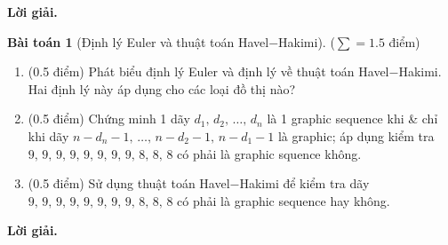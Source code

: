 \documentclass[a4paper, 11pt]{article}
\theoremstyle{definition}
\newtheorem{baitoan}{Bài toán}
\begin{document}
	\textbf{Lời giải. }

	\begin{tcolorbox}[breakable]
    	\begin{baitoan}[Định lý Euler và thuật toán Havel$-$Hakimi]
			($\sum = 1.5$ điểm)
			\begin{enumerate}[label=(\alph*)]
				\item (0.5 điểm) Phát biểu định lý Euler và định lý về thuật toán Havel$-$Hakimi. Hai định lý này áp dụng cho các loại đồ thị nào?
				\item (0.5 điểm) \cite[P10.1.13, p. 368]{shahriari2021invitation} Chứng minh 1 dãy $d_1,\,d_2,\,\ldots,\,d_n$ là 1 graphic sequence khi \& chỉ khi dãy $n - d_n - 1,\,\ldots,\,n - d_2 - 1,\,n - d_1 - 1$ là graphic; áp dụng kiểm tra $9,\,9,\,9,\,9,\,9,\,9,\,9,\,9,\,8,\,8,\,8$ có phải là graphic squence không. 	
				\item (0.5 điểm) Sử dụng thuật toán Havel$-$Hakimi để kiểm tra dãy $9,\,9,\,9,\,9,\,9,\,9,\,9,\,9,\,8,\,8,\,8$ có phải là graphic sequence hay không.
			\end{enumerate}
		\end{baitoan}
	\end{tcolorbox}

	\textbf{Lời giải. }
\end{document}

